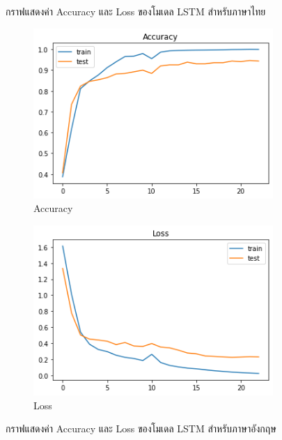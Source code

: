 \documentclass[12pt,oneside,openright,a4paper]{cpe-thai-project}
\begin{document}
\begin{itemize}
\begin{figure}[!ht]
        \caption{กราฟแสดงค่า Accuracy และ Loss ของโมเดล LSTM สำหรับภาษาไทย}
        \label{fig:lstm_thai}
      \end{figure}
      \begin{figure}[!ht]\centering
        \begin{subfigure}{0.49\textwidth}
          \includegraphics[width=\linewidth]{./img/lstm_eng_acc.png} 
          \caption{Accuracy}
          \label{fig:lstm_eng_acc}
        \end{subfigure}
        \begin{subfigure}{0.49\textwidth}
          \includegraphics[width=\linewidth]{./img/lstm_eng_loss.png}
          \caption{Loss}
          \label{fig:lstm_eng_loss}
        \end{subfigure}
        \caption{กราฟแสดงค่า Accuracy และ Loss ของโมเดล LSTM สำหรับภาษาอังกฤษ}

\end{figure}
\end{itemize}
\end{document}
